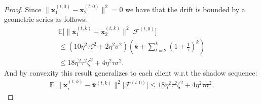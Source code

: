 \begin{proof}
    Since $\| \bm{x}_1^{(t,0)} - \bm{x}_2^{(t,0)} \|^2 = 0 $ we have that the drift is bounded by a geometric series as follows:
    \begin{align*}
        \mathbb{E} \bigg[ \| \bm{x}_1^{(t,k)} - \bm{x}_2^{(t,k)} \|^2 | \mathcal{F}^{(t,0)} \bigg] \\
        \leq ( 10 \eta^2 \tau \zeta^2   + 2 \eta^2 \sigma^2 ) \left(k + \sum^k_{t=2} (1+\frac{1}{\tau})^k\right) \\
        \leq 18 \eta^2 \tau^2 \zeta^2   + 4 \eta^2 \tau \sigma^2 .
    \end{align*}
    And by convexity this result generalizes to each client w.r.t the shadow sequence:
    \begin{align*}
        \mathbb{E} \bigg[ \| \bm{x}_i^{(t,k)} - \bar{\bm{x}}^{(t,k)} \|^2 | \mathcal{F}^{(t,0)} \bigg]
        \leq 18 \eta^2 \tau^2 \zeta^2   + 4 \eta^2 \tau \sigma^2 .
    \end{align*}
\end{proof}
